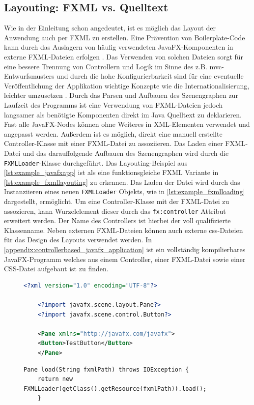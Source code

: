 \subsection{Layouting: FXML vs. Quelltext}
Wie in der Einleitung schon angedeutet, ist es möglich das Layout der Anwendung auch per FXML zu erstellen. Eine Prävention von Boilerplate-Code kann durch das Auslagern von häufig verwendeten JavaFX-Komponenten in externe FXML-Dateien erfolgen \cite{Kruk2018}. Das Verwenden von solchen Dateien sorgt für eine bessere Trennung von Controllern und Logik im Sinne des z.B. \ac{mvc}-Entwurfsmusters \cite{Juneau2013} und durch die hohe Konfigurierbarkeit sind für eine eventuelle Veröffentlichung der Applikation wichtige Konzepte wie die Internationalisierung, leichter umzusetzen \cite{Steyer2014}. Durch das Parsen und Aufbauen des Szenengraphen zur Laufzeit des Programms ist eine Verwendung von FXML-Dateien jedoch langsamer als benötigte Komponenten direkt im Java Quelltext zu deklarieren. Fast alle JavaFX-Nodes können ohne Weiteres in XML-Elementen verwendet und angepasst werden. Außerdem ist es möglich, direkt eine manuell erstellte Controller-Klasse mit einer FXML-Datei zu assoziieren. Das Laden einer FXML-Datei und das darauffolgende Aufbauen des Szenengraphen wird durch die \texttt{FXMLLoader}-Klasse durchgeführt. Das Layouting-Beispiel aus \autoref{lst:example_javafxapp} ist als eine funktionsgleiche FXML Variante in \autoref{lst:example_fxmllayouting} zu erkennen. Das Laden der Datei wird durch das Instanziieren eines neuen \texttt{FXMLLoader} Objekts, wie in \autoref{lst:example_fxmlloading} dargestellt, ermöglicht.
\noindent Um eine Controller-Klasse mit der FXML-Datei zu assozieren, kann Wurzelelement dieser durch das \texttt{fx:controller} Attribut erweitert werden. Der Name des Controllers ist hierbei der voll qualifizierte Klassenname. Neben externen FXML-Dateien können auch externe \ac{css}-Dateien für das Design des Layouts verwendet werden. In \autoref{appendix:controllerbased_javafx_application} ist ein vollständig kompilierbares JavaFX-Programm welches aus einem Controller, einer FXML-Datei sowie einer CSS-Datei aufgebaut ist zu finden.

\begin{figure}[H]
	\begin{lstlisting}[caption={Beispiel -- FXML Layouting.}, captionpos=b, label=lst:example_fxmllayouting, language=XML]
	<?xml version="1.0" encoding="UTF-8"?>
	
	<?import javafx.scene.layout.Pane?>
	<?import javafx.scene.control.Button?>
	
	<Pane xmlns="http://javafx.com/javafx">
	<Button>TestButton</Button>
	</Pane>
	\end{lstlisting}
\end{figure}
\begin{figure}[H]
	\begin{lstlisting}[caption={Beispiel -- FXML Ladeprozess.}, captionpos=b, label=lst:example_fxmlloading]
	Pane load(String fxmlPath) throws IOException {
	return new FXMLLoader(getClass().getResource(fxmlPath)).load();
	}
	\end{lstlisting}
\end{figure}

